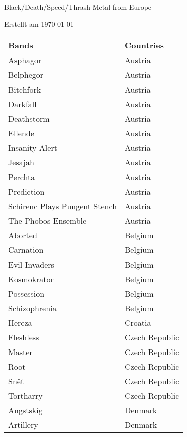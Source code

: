 \documentclass[12pt, a4paper, twoside]{report}
\begin{document}
	
	\begin{center}
		\vspace{1cm}
		{\Large Black/Death/Speed/Thrash Metal from Europe\par}
		
		{\large Erstellt am \today\par}
	\end{center}
	
	\begin{center}
		\begin{longtable}{|p{5cm}|p{5cm}|} 
			
			\hline
			\rowcolor{lightgray} Bands & Countries \\ \hline
			\endhead
Asphagor & Austria \\ \hline
Belphegor & Austria \\ \hline
Bitchfork & Austria \\ \hline
Darkfall & Austria \\ \hline
Deathstorm & Austria \\ \hline
Ellende & Austria \\ \hline
Insanity Alert & Austria \\ \hline
Jesajah & Austria \\ \hline
Perchta & Austria \\ \hline
Prediction & Austria \\ \hline
Schirenc Plays Pungent Stench & Austria \\ \hline
The Phobos Ensemble & Austria \\ \hline
Aborted & Belgium \\ \hline
Carnation & Belgium \\ \hline
Evil Invaders & Belgium \\ \hline
Kosmokrator & Belgium \\ \hline
Possession & Belgium \\ \hline
Schizophrenia & Belgium \\ \hline
Hereza & Croatia \\ \hline
Fleshless & Czech Republic \\ \hline
Master & Czech Republic \\ \hline
Root & Czech Republic \\ \hline
Sněť & Czech Republic \\ \hline
Tortharry & Czech Republic \\ \hline
Angstskíg & Denmark \\ \hline
Artillery & Denmark \\ \hline

\end{longtable}
\end{center}
\end{document}
